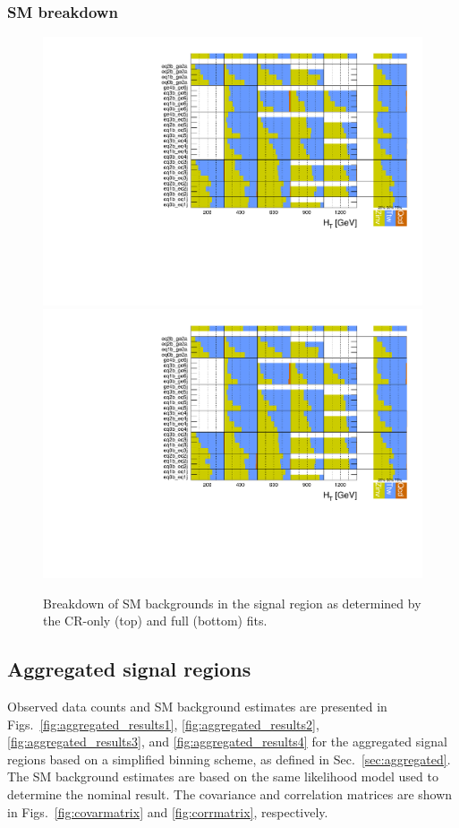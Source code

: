 \clearpage
\subsubsection{SM breakdown}

\begin{figure}[h!]
  \centering
  \caption{Breakdown of SM backgrounds in the signal region as
    determined by the CR-only (top) and full (bottom) fits.}
  \label{fig:breakdown}
  \includegraphics[width=0.8\linewidth]{figures/results/36invfb/breakdown/crfit/Signal_sample_composition.pdf}\\
  \includegraphics[width=0.8\linewidth]{figures/results/36invfb/breakdown/postfit/Signal_sample_composition.pdf}
\end{figure}

\clearpage
\subsection{Aggregated signal regions}
\label{sec:aggregated-results}

Observed data counts and SM background estimates are presented in
Figs.~\ref{fig:aggregated_results1}, \ref{fig:aggregated_results2},
\ref{fig:aggregated_results3}, and \ref{fig:aggregated_results4} for
the aggregated signal regions based on a simplified binning scheme, as
defined in Sec.~\ref{sec:aggregated}. The SM background estimates are
based on the same likelihood model used to determine the nominal
result. The covariance and correlation matrices are shown in
Figs.~\ref{fig:covarmatrix} and \ref{fig:corrmatrix}, respectively. 


